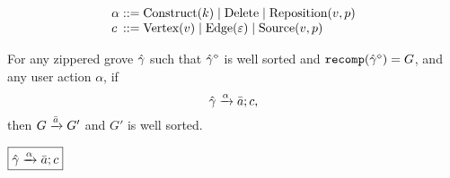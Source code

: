 \[
  \arraycolsep=0pt
  \begin{array}{llll}
    \alpha & {}::={} &
      \Construct{k}
      \mid \Delete
      \mid \Reposition{v}{p}
    \\
    c & {}::={} &
      \CVertex{v}
      \mid \CEdge{\e}
      \mid \CSource{v}{p}
    \\
  \end{array}
\]

\begin{theorem}[Sensibility]
  For any zippered grove $\Z{\Grove}$
  such that $\erase{\Z{\Grove}}$ is well sorted
    and $\recomp{\erase{\Z{\Grove}}} = G$,
  and any user action $\alpha$,
  if
  \[
    \applyAction{\Z{\Grove}}{\alpha}{\Q{a}}{c},
  \]
  then $G \action{\Q{a}} G'$ and $G'$ is well sorted.
\end{theorem}

\noindent $\boxed{\applyAction{ \Z{\Grove} }{ \alpha }{ \Q{a} }{ c }}$
%
\begin{mathpar}


\end{mathpar}

